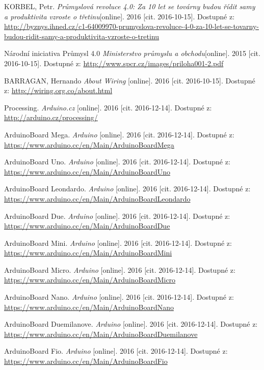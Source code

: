 \begin{literatura}{99}
 KORBEL, Petr. \textit{Průmyslová revoluce 4.0: Za 10 let se továrny budou řídit samy a produktivita vzroste o třetinu}[online]. 2016 [cit. 2016-10-15]. Dostupné z: \url{http://byznys.ihned.cz/c1-64009970-prumyslova-revoluce-4-0-za-10-let-se-tovarny-budou-ridit-samy-a-produktivita-vzroste-o-tretinu}

 Národní iniciativa Průmysl 4.0 \textit{Ministerstvo průmyslu a obchodu}[online]. 2015 [cit. 2016-10-15]. Dostupné z: \url{http://www.spcr.cz/images/priloha001-2.pdf}

 BARRAGAN, Hernando \textit{About Wiring} [online]. 2016 [cit. 2016-10-15]. Dostupné z: \url{http://wiring.org.co/about.html}

 Processing. \textit{Arduino.cz} [online]. 2016 [cit. 2016-12-14]. Dostupné z: \url{http://arduino.cz/processing/}

 ArduinoBoard Mega. \textit{Arduino} [online]. 2016 [cit. 2016-12-14]. Dostupné z: \url{https://www.arduino.cc/en/Main/ArduinoBoardMega}

 ArduinoBoard Uno. \textit{Arduino} [online]. 2016 [cit. 2016-12-14]. Dostupné z: \url{https://www.arduino.cc/en/Main/ArduinoBoardUno}

 ArduinoBoard Leondardo. \textit{Arduino} [online]. 2016 [cit. 2016-12-14].  Dostupné z: \url{https://www.arduino.cc/en/Main/ArduinoBoardLeondardo}

 ArduinoBoard Due. \textit{Arduino} [online]. 2016 [cit. 2016-12-14]. Dostupné z: \url{https://www.arduino.cc/en/Main/ArduinoBoardDue}

 ArduinoBoard Mini. \textit{Arduino} [online]. 2016 [cit. 2016-12-14]. Dostupné z: \url{https://www.arduino.cc/en/Main/ArduinoBoardMini}

 ArduinoBoard Micro. \textit{Arduino} [online]. 2016 [cit. 2016-12-14]. Dostupné z: \url{https://www.arduino.cc/en/Main/ArduinoBoardMicro}

 ArduinoBoard Nano. \textit{Arduino} [online]. 2016 [cit. 2016-12-14]. Dostupné z: \url{https://www.arduino.cc/en/Main/ArduinoBoardNano}

 ArduinoBoard Duemilanove. \textit{Arduino} [online]. 2016 [cit. 2016-12-14]. Dostupné z: \url{https://www.arduino.cc/en/Main/ArduinoBoardDuemilanove}

 ArduinoBoard Fio. \textit{Arduino} [online]. 2016 [cit. 2016-12-14]. Dostupné z: \url{https://www.arduino.cc/en/Main/ArduinoBoardFio}


\end{literatura}
